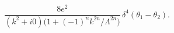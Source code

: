 \begin{equation}
\frac{8e^2}{(k^2+i0) \Big(1+(-1)^n k^{2n}/\Lambda^{2n}\Big)} \,
\delta^4(\theta_1-\theta_2).
\end{equation}

